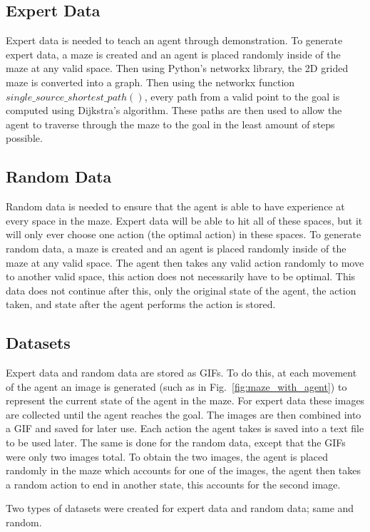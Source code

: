 \documentclass[12pt,american]{report}
\begin{document}
\subsection{Expert Data}
Expert data is needed to teach an agent through demonstration.  To generate expert data, a maze is created and an agent is placed randomly inside of the maze at any valid space. Then using Python's networkx library, the 2D grided maze is converted into a graph.  Then using the networkx function $single\_source\_shortest\_path()$, every path from a valid point to the goal is computed using Dijkstra's algorithm. These paths are then used to allow the agent to traverse through the maze to the goal in the least amount of steps possible.

\subsection{Random Data}
\label{sec:random_data}
Random data is needed to ensure that the agent is able to have experience at every space in the maze.  Expert data will be able to hit all of these spaces, but it will only ever choose one action (the optimal action) in these spaces. To generate random data, a maze is created and an agent is placed randomly inside of the maze at any valid space.  The agent then takes any valid action randomly to move to another valid space, this action does not necessarily have to be optimal. This data does not continue after this, only the original state of the agent, the action taken, and state after the agent performs the action is stored.

\subsection{Datasets}
Expert data and random data are stored as GIFs.  To do this, at each movement of the agent an image is generated (such as in Fig.~\ref{fig:maze_with_agent}) to represent the current state of the agent in the maze.  For expert data these images are collected until the agent reaches the goal. The images are then combined into a GIF and saved for later use.  Each action the agent takes is saved into a text file to be used later. The same is done for the random data, except that the GIFs were only two images total.  To obtain the two images, the agent is placed randomly in the maze which accounts for one of the images, the agent then takes a random action to end in another state, this accounts for the second image. 

Two types of datasets were created for expert data and random data; same and random.
\end{document}

